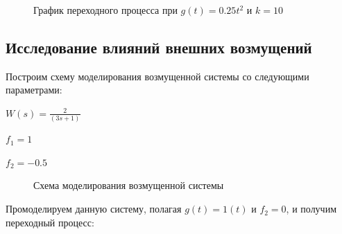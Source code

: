 \documentclass[a4paper, 11pt]{article}
\begin{document}
\newpage
\begin{figure}[h!]
\caption{График переходного процесса при $g(t)=0.25t^2$ и $k = 10$}
\label{ris:image}
\end{figure}

\newpage
\begin{center}
\section{Исследование влияний внешних возмущений}
\end{center}
\par 
Построим схему моделирования возмущенной системы со следующими параметрами:
\par 
$W(s)=\displaystyle\frac{2}{(3s+1)}$
\par 
$f_1=1$
\par 
$f_2=-0.5$

\begin{figure}[h!]
\caption{Схема моделирования возмущенной системы}
\label{ris:image}
\end{figure}

\par 
	Промоделируем данную систему, полагая $g(t)=1(t)$  и $f_2=0$, и получим переходный процесс:
	
\end{document}
